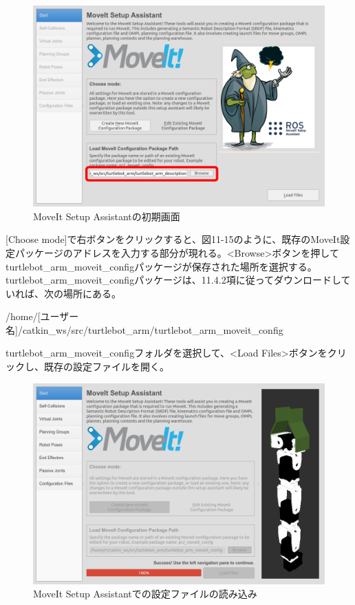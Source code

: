 \begin{figure}[ht]
  \centering
  \includegraphics[width=\columnwidth]{pictures/chapter11/pic_11_14.png}
  \caption{MoveIt Setup Assistantの初期画面}
\end{figure}

[Choose mode]で右ボタンをクリックすると、図11-15のように、既存のMoveIt設定パッケージのアドレスを入力する部分が現れる。<Browse>ボタンを押してturtlebot\_arm\_moveit\_configパッケージが保存された場所を選択する。 turtlebot\_arm\_moveit\_configパッケージは、11.4.2項に従ってダウンロードしていれば、次の場所にある。

/home/[ユーザー名]/catkin\_ws/src/turtlebot\_arm/turtlebot\_arm\_moveit\_config

turtlebot\_arm\_moveit\_configフォルダを選択して、<Load Files>ボタンをクリックし、既存の設定ファイルを開く。

\begin{figure}[ht]
  \centering
  \includegraphics[width=\columnwidth]{pictures/chapter11/pic_11_15.png}
  \caption{MoveIt Setup Assistantでの設定ファイルの読み込み}
\end{figure}

